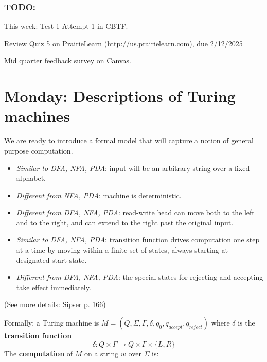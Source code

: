 \documentclass[12pt, oneside]{article}
\begin{document}
\vspace{-20pt}

\subsubsection*{TODO:}
\begin{list}{\itemsep -20pt}
   \item This week: Test 1 Attempt 1 in CBTF. 
   \item Review Quiz 5 on PrairieLearn (http://us.prairielearn.com), due 2/12/2025
   \item Mid quarter feedback survey on Canvas.
\end{list}

\newpage

\section*{Monday: Descriptions of Turing machines}



We are ready to introduce a formal model that will capture a notion of general purpose computation.
\begin{itemize}
\item {\it Similar to DFA, NFA, PDA}: input will be an arbitrary string over a fixed alphabet.
\item {\it Different from NFA, PDA}: machine is deterministic.
\item {\it Different from DFA, NFA, PDA}: read-write head can move both to the left and to the right,
and can extend to the right past the original input.
\item {\it Similar to DFA, NFA, PDA}: transition function drives computation one step at a time 
by moving within a finite set of states, always starting at designated start state.
\item {\it Different from DFA, NFA, PDA}: the special states for rejecting and accepting take effect immediately.
\end{itemize}

\vspace{-10pt}

(See more details: Sipser p. 166)

\vfill

Formally: a  Turing machine is $M= (Q, \Sigma, \Gamma, \delta, q_0, q_{accept}, q_{reject})$ 
where $\delta$ is the {\bf transition function} 
\[
  \delta: Q\times \Gamma \to Q \times \Gamma \times \{L, R\}
\]
The {\bf computation} of $M$ on a string $w$ over $\Sigma$  is:
\end{document}

